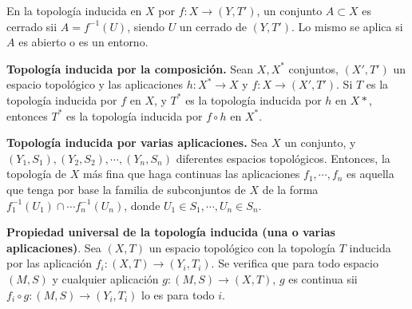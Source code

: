 \documentclass[a4paper, 11pt]{extarticle}
\begin{document}
En la topología inducida en \(X\) por \(f: X \rightarrow (Y, T')\), un
conjunto \(A \subset X\) es cerrado sii \(A = f ^{-1}(U)\), siendo \(U\) 
un cerrado de \((Y, T')\). Lo mismo se aplica si \(A\) es abierto o es un
entorno. 

\textbf{Topología inducida por la composición.} Sean \(X, X^*\) conjuntos, \((X', T')\)
un espacio topológico y las aplicaciones \(h: X^* \rightarrow  X\) y \(f: X
\rightarrow (X', T')\). Si \(T\) es la topología inducida por \(f\) en \(X\), y \(T^*\) es la topología inducida por \(h\) en \(X*\), entonces \(T^*\) es la topología inducida por \(f \circ h\) en \(X^*\).

\textbf{Topología inducida por varias aplicaciones.}  Sea \(X\) un conjunto, y 
\((Y_1, S_1), (Y_2, S_2), \cdots, (Y_n, S_n)\) diferentes espacios
topológicos. Entonces, la topología de \(X\) más fina que haga continuas las
aplicaciones \(f_1, \cdots, f_n\) es aquella que tenga por base la familia de
subconjuntos de \(X\) de la forma \(f_1 ^{-1}(U_1) \cap \cdots f_n ^{-1}(U_n)\), donde \(U_1 \in S_1, \cdots, U_n \in S_n\).

\textbf{Propiedad universal de la topología inducida (una o varias aplicaciones)}. 
Sea \((X,T)\) un espacio
topológico con la topología \(T\) inducida por las aplicación \(f_i :
(X, T)
\rightarrow (Y_i,T_i)\). Se verifica que para todo espacio \((M,S)\) y
cualquier aplicación \(g: (M,S) \rightarrow (X,T)\), \(g\) es continua sii
\(f_i \circ g : (M,S) \rightarrow  (Y_i,T_i)\) lo es para todo \(i\).
\end{document}
